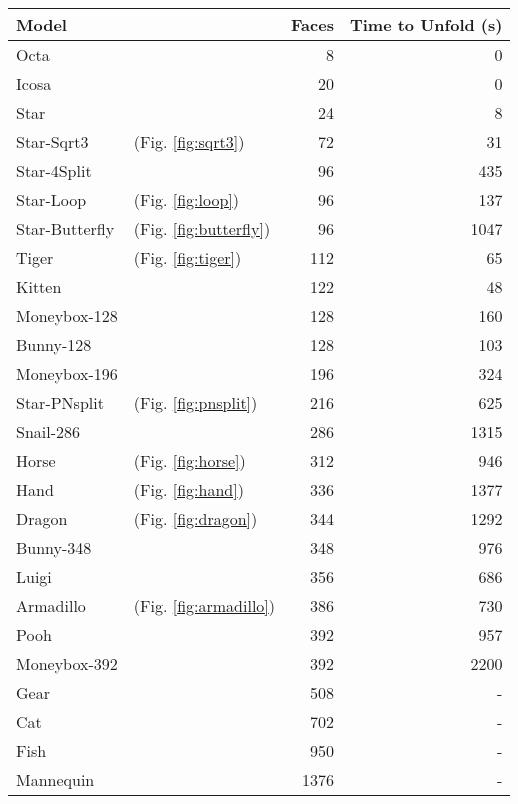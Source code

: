 \documentclass[draft,final]{vutinfth} %
\begin{document}
\begingroup
\centering
\begin{tabular}{|ll|r|r|}
\hline
Model & & Faces & Time to Unfold (s) \\
\hline
Octa & & 8 & 0 \\
Icosa & & 20 & 0 \\
Star & & 24 & 8 \\
Star-Sqrt3 & (Fig. \ref{fig:sqrt3}) & 72 & 31 \\
Star-4Split & & 96 & 435 \\
Star-Loop & (Fig. \ref{fig:loop}) & 96 & 137 \\
Star-Butterfly & (Fig. \ref{fig:butterfly}) & 96 & 1047 \\
Tiger & (Fig. \ref{fig:tiger}) & 112 & 65 \\
Kitten & & 122 & 48 \\
Moneybox-128 & & 128 & 160 \\
Bunny-128 & & 128 & 103 \\
Moneybox-196 & & 196 & 324 \\
Star-PNsplit & (Fig. \ref{fig:pnsplit}) & 216 & 625 \\
Snail-286 & & 286 & 1315 \\
Horse & (Fig. \ref{fig:horse}) & 312 & 946 \\
Hand & (Fig. \ref{fig:hand}) & 336 & 1377 \\
Dragon & (Fig. \ref{fig:dragon}) & 344 & 1292 \\
Bunny-348 & & 348 & 976 \\
Luigi & & 356 & 686 \\
Armadillo & (Fig. \ref{fig:armadillo}) & 386 & 730 \\
Pooh & & 392 & 957 \\
Moneybox-392 & & 392 & 2200 \\
Gear & & 508 & - \\
Cat & & 702 & - \\
Fish & & 950 & - \\
Mannequin & & 1376 & - \\
\hline
\end{tabular}
\label{tbl:performance}
\endgroup
\end{document}
